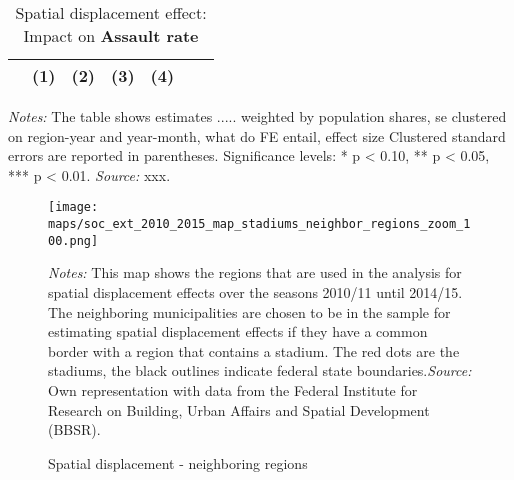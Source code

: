 \documentclass[11pt, a4paper, draft]{article} %
\begin{document}
\vspace*{\fill}
\begin{table}[H] \centering 
	\begin{threeparttable} \centering \caption{Spatial displacement effect: Impact on \textbf{Assault rate}}\label{tab_soc_ext:reg_fe_assrate_neighbor_regions}
		{\def\sym#1{\ifmmode^{#1}\else\(^{#1}\)\fi} 
			\begin{tabular}{l*{6}{c}}
				\toprule 
				&\multicolumn{1}{c}{(1)}&\multicolumn{1}{c}{(2)}&\multicolumn{1}{c}{(3)}&\multicolumn{1}{c}{(4)}\\
				\midrule
				 
				\bottomrule 
		\end{tabular}}
		\begin{tablenotes} 
			\item \scriptsize \emph{Notes:} The table shows estimates ..... 
			weighted by population shares, se clustered on region-year and year-month, what do FE entail, effect size
			Clustered standard errors are reported in parentheses. \newline Significance levels: * p < 0.10, ** p < 0.05, *** p < 0.01. \newline 	\emph{Source:} xxx.
		\end{tablenotes} 
	\end{threeparttable} 
\end{table}
\vspace*{\fill}\clearpage 


\vspace*{\fill}
\begin{figure}[H]\centering
	\caption{Spatial displacement - neighboring regions}\label{fig_soc_ext:map_neighboring_regions}
	\texttt{[image: maps/soc\_ext\_2010\_2015\_map\_stadiums\_neighbor\_regions\_zoom\_100.png]}
	\begin{minipage}{0.95\linewidth}
		\scriptsize{\emph{Notes:} This map shows the regions that are used in the analysis for spatial displacement effects over the seasons 2010/11 until 2014/15. The neighboring municipalities are chosen to be in the sample for estimating spatial displacement effects if they have a common border with a region that contains a stadium. The red dots are the stadiums, the black outlines indicate federal state boundaries.\newline \emph{Source:} Own representation with data from the Federal Institute for Research on Building, Urban Affairs and Spatial Development (BBSR).}
	\end{minipage}
\end{figure}
\vspace*{\fill}\clearpage
\end{document}
